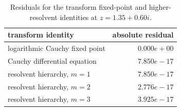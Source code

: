 \begin{table}[htbp]
\centering\small
\begin{tabular}{@{}lr@{}}
\toprule
transform identity & absolute residual\\
\midrule
logarithmic Cauchy fixed point & $0.000e+00$\\
Cauchy differential equation & $7.850e-17$\\
resolvent hierarchy, $m=1$ & $7.850e-17$\\
resolvent hierarchy, $m=2$ & $2.776e-17$\\
resolvent hierarchy, $m=3$ & $3.925e-17$\\
\bottomrule\end{tabular}
\caption{Residuals for the transform fixed-point and higher-resolvent identities at $z=1.35+0.60i$.}
\label{p10:tab:cauchy-check}
\end{table}
